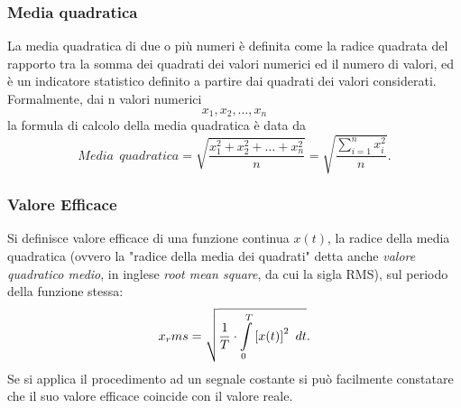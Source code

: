 \documentclass[12pt,oneside,openany]{memoir}
\numberwithin{equation}{subsection}
\newcommand{\dt}{\ dt}
\begin{document}
\subsubsection{Media quadratica}
La media quadratica di due o pi\`u numeri \`e definita come la radice quadrata del rapporto tra la somma dei quadrati dei valori numerici ed il numero di valori, ed \`e un indicatore statistico definito a partire dai quadrati dei valori considerati.
Formalmente, dai n valori numerici
\begin{equation}
x_1, x_2, \dots , x_n
\end{equation}
la formula di calcolo della media quadratica \`e data da
\begin{equation}
Media \ \ quadratica = \sqrt{\frac{x_1^2 + x_2^2 + \dots + x_n^2}{n}} = \sqrt{\frac{\sum_{i = 1}^{n} x_i^2}{n}}.
\end{equation}
\subsubsection{Valore Efficace}
Si definisce valore efficace di una funzione continua $x(t)$, la radice della media quadratica (ovvero la "radice della media dei quadrati" detta anche \textit{valore quadratico medio}, in inglese \textit{root mean square}, da cui la sigla RMS), sul periodo della funzione stessa: 
\begin{equation}
	x_rms = \sqrt{\frac{1}{T} \cdot \int\displaylimits_{0}^{T} \left[x(t)\right]^2 \dt}.
\end{equation}
Se si applica il procedimento ad un segnale costante si può facilmente constatare che il suo valore efficace coincide con il valore reale. 

\newpage
\end{document}
